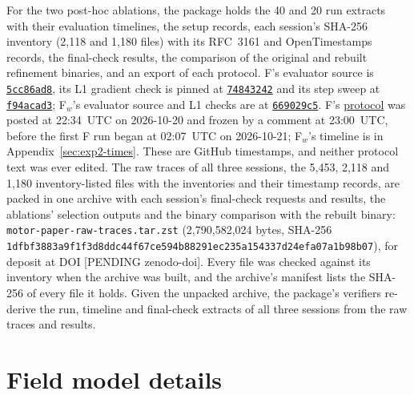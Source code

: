 \documentclass{anvil-paper}
\begin{document}
For the two post-hoc ablations, the package holds the 40 and 20 run
extracts with their evaluation timelines, the setup records, each session's SHA-256 inventory (2,118 and
1,180 files) with its RFC~3161 and OpenTimestamps records, the final-check
results, the comparison of the original and rebuilt refinement binaries,
and an export of each protocol. F's evaluator source is
\href{https://github.com/rjwalters/geode-fem/tree/5cc86ad81aeea4847a2608fcafde22a1bbfb6990/benchmarks/motor_optimization}{\texttt{5cc86ad8}},
its L1 gradient check is pinned at
\href{https://github.com/rjwalters/geode-fem/tree/74843242db03e8d57edf971420171064bf19f107/benchmarks/motor_optimization/harness}{\texttt{74843242}}
and its step sweep at
\href{https://github.com/rjwalters/geode-fem/tree/f94acad3f312c7d417830ff82b66a78a1ea89fb2/benchmarks/motor_optimization/harness}{\texttt{f94acad3}};
F$_w$'s evaluator source and L1 checks are at
\href{https://github.com/rjwalters/geode-fem/tree/669029c5653cb5fe4724ec0c7525ba60c770975e/benchmarks/motor_optimization}{\texttt{669029c5}}.
F's \href{https://github.com/rjwalters/geode-fem/issues/1218}{protocol}
was posted at 22:34~UTC on 2026-10-20 and frozen by a comment at
23:00~UTC, before the first F run began at 02:07~UTC on 2026-10-21;
F$_w$'s timeline is in Appendix~\ref{sec:exp2-times}. These are GitHub
timestamps, and neither protocol text was ever edited. The raw traces of all
three sessions, the 5,453, 2,118 and 1,180 inventory-listed files with the
inventories and their timestamp records, are packed in one archive with
each session's final-check requests and results, the ablations' selection
outputs and the binary comparison with the rebuilt binary:
\texttt{motor-paper-raw-traces.tar.zst} (2,790,582,024 bytes, SHA-256
\texttt{1dfbf3883a9f1f3d8ddc44f67ce594b8}\allowbreak\texttt{8291ec235a154337d24efa07a1b98b07}), for deposit at
DOI [PENDING zenodo-doi]. Every file was checked against its inventory
when the archive was built, and the archive's manifest lists the SHA-256
of every file it holds. Given the unpacked archive, the package's verifiers
re-derive the run, timeline and final-check extracts of all three sessions
from the raw traces and results.

\appendix
\section{Field model details}\label{sec:fieldmodel}
\end{document}
